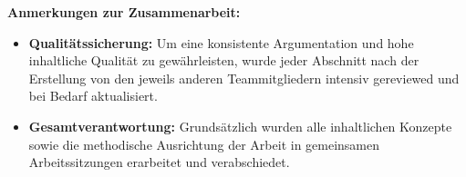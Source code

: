 \medskip
\noindent
\textbf{Anmerkungen zur Zusammenarbeit:}
\begin{itemize}
    \item \textbf{Qualitätssicherung:} Um eine konsistente Argumentation und hohe inhaltliche Qualität zu gewährleisten, wurde jeder Abschnitt nach der Erstellung von den jeweils anderen Teammitgliedern intensiv gereviewed und bei Bedarf aktualisiert.
    \item \textbf{Gesamtverantwortung:} Grundsätzlich wurden alle inhaltlichen Konzepte sowie die methodische Ausrichtung der Arbeit in gemeinsamen Arbeitssitzungen erarbeitet und verabschiedet.
\end{itemize}

